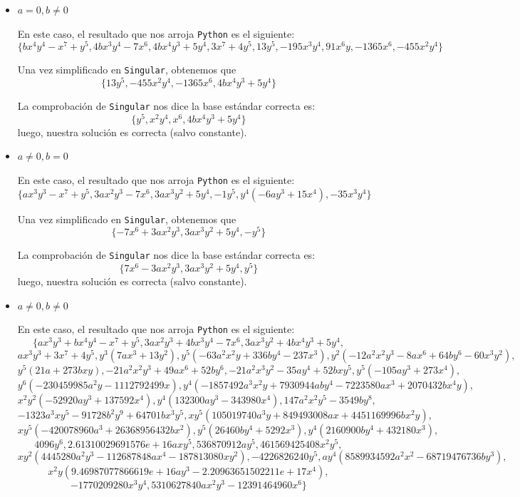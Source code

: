 \documentclass[10pt,a4paper]{article}
\begin{document}
\begin{enumerate}[label=(\alph*)]
\begin{itemize}
			\medskip
			
			\item \(a = 0, b \neq 0\)
			
			En este caso, el resultado que nos arroja \texttt{Python} es el siguiente:
			\[
			\{bx^4y^4 - x^7 + y^5,4bx^3y^4 - 7x^6,4bx^4y^3 + 5y^4,3x^7 + 4y^5,13y^5,-195x^3y^4,91x^6y,-1365x^6,-455x^2y^4\}
			\]
			
			Una vez simplificado en \texttt{Singular}, obtenemos que
			\[
				\{13 y^5, -455 x^2 y^4, -1365 x^6, 4b x^4 y^3 + 5 y^4\}
			\]
			
			La comprobación de \texttt{Singular} nos dice la base estándar correcta es:
			\[
				\{y^5, x^2 y^4, x^6, 4b x^4y^3 + 5 y^4\}
			\]
			luego, nuestra solución es correcta (salvo constante).

			\medskip			
			
			\item \(a \neq 0, b = 0\)
			
			En este caso, el resultado que nos arroja \texttt{Python} es el siguiente:
			\[
			\{ax^3y^3 - x^7 + y^5,3ax^2y^3 - 7x^6,3ax^3y^2 + 5y^4,-1y^5,y^4(-6ay^3 + 15x^4),-35x^3y^4\}
			\]
			
			Una vez simplificado en \texttt{Singular}, obtenemos que
			\[
				\{-7 x^6 + 3a x^2 y^3, 3a x^3 y^2 + 5y^4, -y^5\}
			\]
			
			La comprobación de \texttt{Singular} nos dice la base estándar correcta es:
			\[
				\{7 x^6 - 3a x^2 y^3, 3a x^3 y^2 + 5y^4, y^5\}
			\]
			luego, nuestra solución es correcta (salvo constante).
			
			\medskip			
			
			\item \(a \neq 0, b \neq 0\)
			
			En este caso, el resultado que nos arroja \texttt{Python} es el siguiente:
			\[
			\{ax^3y^3 + bx^4y^4 - x^7 + y^5,3ax^2y^3 + 4bx^3y^4 - 7x^6,3ax^3y^2 + 4bx^4y^3 + 5y^4,
			\]
			\[
			ax^3y^3 + 3x^7 + 4y^5,y^3(7ax^3 + 13y^2),y^5(-63a^2x^2y + 336by^4 - 237x^3),y^2(-12a^2x^2y^3 - 8ax^6 + 64by^6 - 60x^3y^2),
			\]
			\[
			y^5(21a + 273bxy),-21a^2x^2y^3 + 49ax^6 + 52by^6,-21a^2x^3y^2 - 35ay^4 + 52bxy^5,y^5(-105ay^3 + 273x^4),
			\]
			\[
			y^6(-230459985a^2y - 1112792499x),y^4(-1857492a^3x^2y + 7930944aby^4 - 7223580ax^3 + 2070432bx^4y),
			\]
			\[
			x^2y^2(-52920ay^3 + 137592x^4),y^4(132300ay^3 - 343980x^4),147a^2x^2y^5 - 3549by^8,
			\]
			\[
			-1323a^3xy^5 - 91728b^2y^9 + 64701bx^3y^5, xy^5(105019740a^3y + 849493008ax + 4451169996bx^2y),
			\]
			\[
			xy^5(-420078960a^3 + 26368956432bx^2),y^5(26460by^4 + 5292x^3),y^4(2160900by^4 + 432180x^3),
			\]
			\[
			4096y^6,2.61310029691576e+16axy^5,536870912ay^5,461569425408x^2y^5,
			\]
			\[
			xy^2(4445280a^2y^3 - 112687848ax^4 - 187813080xy^2),-4226826240y^5,ay^4(8589934592a^2x^2 - 68719476736by^3),
			\]
			\[
			x^2y(9.46987077866619e+16ay^3 - 2.20963651502211e+17x^4),			
			\]
			\[
			-1770209280x^3y^4,5310627840ax^2y^3 - 12391464960x^6\}
			\]
			

\end{itemize}
\end{enumerate}
\end{document}
